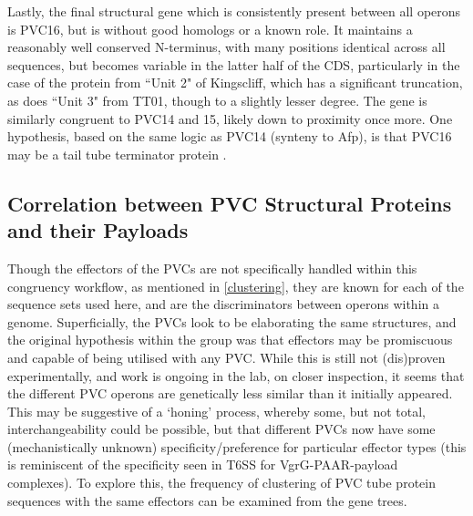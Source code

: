 Lastly, the final structural gene which is consistently present between all operons is PVC16, but is without good homologs or a known role. It maintains a reasonably well conserved N-terminus, with many positions identical across all sequences, but becomes variable in the latter half of the CDS, particularly in the case of the protein from ``Unit 2" of Kingscliff, which has a significant truncation, as does ``Unit 3" from TT01, though to a slightly lesser degree. The gene is similarly congruent to PVC14 and 15, likely down to proximity once more. One hypothesis, based on the same logic as PVC14 (synteny to Afp), is that PVC16 may be a tail tube terminator protein \citep{Rybakova2013}.

 
\subsection{Correlation between PVC Structural Proteins and their Payloads}
 Though the effectors of the PVCs are not specifically handled within this congruency workflow, as mentioned in \vref{clustering}, they are known for each of the sequence sets used here, and are the discriminators between operons within a genome. Superficially, the PVCs look to be elaborating the same structures, and the original hypothesis within the group was that effectors may be promiscuous and capable of being utilised with any PVC. While this is still not (dis)proven experimentally, and work is ongoing in the lab, on closer inspection, it seems that the different PVC operons are genetically less similar than it initially appeared. This may be suggestive of a `honing' process, whereby some, but not total, interchangeability could be possible, but that different PVCs now have some (mechanistically unknown) specificity/preference for particular effector types (this is reminiscent of the specificity seen in T6SS for VgrG-PAAR-payload complexes). To explore this, the frequency of clustering of PVC tube protein sequences with the same effectors can be examined from the gene trees.
 
